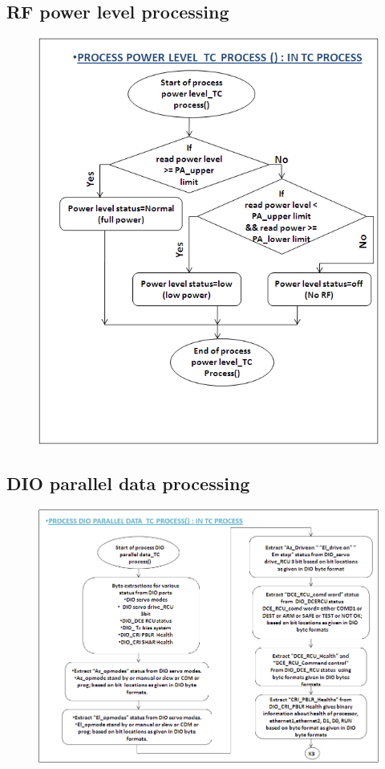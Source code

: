 \subsection{RF power level processing}
\begin{figure}[H]
	\centering
	\includegraphics[width=\linewidth]{./FlowCharts/PngFlowCharts/TC_PA.png}
\end{figure}

\subsection{DIO parallel data processing}
\begin{figure}[H]
	\centering
	\includegraphics[width=\linewidth]{./FlowCharts/PngFlowCharts/TCP6.png}
\end{figure}

